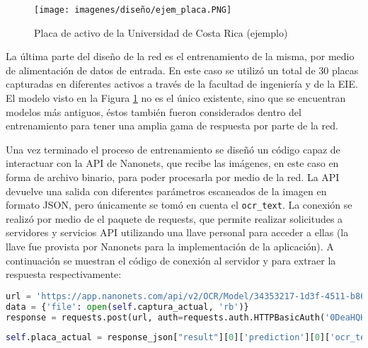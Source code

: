 \begin{figure}[h!]
    \centering
    \texttt{[image: imagenes/diseño/ejem\_placa.PNG]}
    \caption{Placa de activo de la Universidad de Costa Rica (ejemplo)}
    \label{ejem_placa}
\end{figure}
\par
La última parte del diseño de la red es el entrenamiento de la misma, por medio de alimentación de datos de entrada. En este caso se utilizó un total de 30 placas capturadas en diferentes activos a través de la facultad de ingeniería y de la EIE. El modelo visto en la Figura \ref{ejem_placa} no es el único existente, sino que se encuentran modelos más antiguos, éstos también fueron considerados dentro del entrenamiento para tener una amplia gama de respuesta por parte de la red. 
\par
Una vez terminado el proceso de entrenamiento se diseñó un código capaz de interactuar con la API de Nanonets, que recibe las imágenes, en este caso en forma de archivo binario, para poder procesarla por medio de la red. La API devuelve una salida con diferentes parámetros escaneados de la imagen en formato JSON, pero únicamente se tomó en cuenta el \lstinline{ocr_text}. La conexión se realizó por medio de el paquete de requests, que permite realizar solicitudes a servidores y servicios API utilizando una llave personal para acceder a ellas (la llave fue provista por Nanonets para la implementación de la aplicación). A continuación se muestran el código de conexión al servidor y para extraer la respuesta respectivamente: 

\begin{lstlisting}[language=Python,frame=single,caption=Código para envío de las placas y recibimiento del texto de la misma (creación propia), inputencoding=latin1]
url = 'https://app.nanonets.com/api/v2/OCR/Model/34353217-1d3f-4511-b86f-e24e842e66e8/LabelFile/?async=false'
data = {'file': open(self.captura_actual, 'rb')}
response = requests.post(url, auth=requests.auth.HTTPBasicAuth('0DeaHQHCf7qAs9n7mFAGmF9gHd6IVMA9', ''), files=data)
\end{lstlisting}

\begin{lstlisting}[language=Python,frame=single,caption=Código para extracción del texto de la placa de la respuesta de la red neuronal (creación propia), inputencoding=latin1]
self.placa_actual = response_json["result"][0]['prediction'][0]['ocr_text']
\end{lstlisting}


